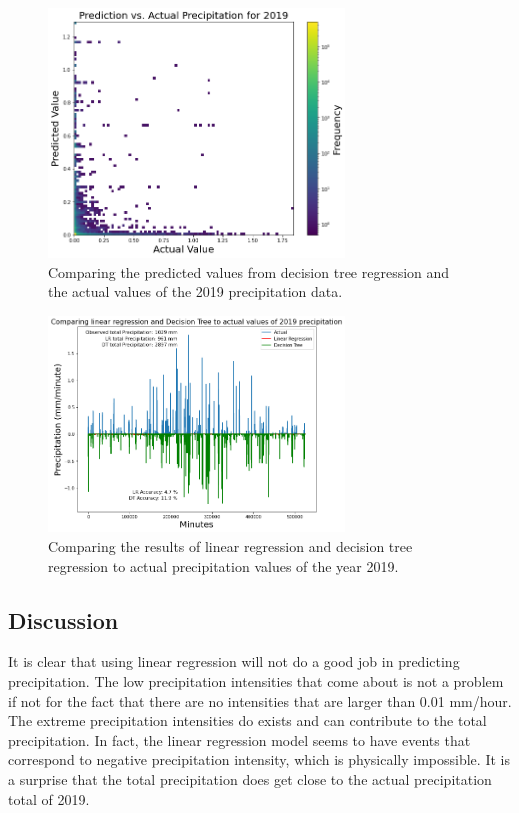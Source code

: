 \documentclass[11pt]{report}
\begin{document}
\begin{figure}[th!]
  \centering
  \includegraphics[width=0.7\textwidth]{Figures/predict_and_actual_2019_precip.png}
  \caption[Comparing ML predicted values to actual precipitation
    values]{\label{DT_compare}Comparing the predicted values from decision tree
    regression and the actual values of the 2019 precipitation data.
  }
\end{figure}
\begin{figure}[bh!]
  \centering
  \includegraphics[width = 0.7\textwidth]{Figures/Comparison.png}
  \caption[Comparing ML results to actual precipitation values]{\label{LR_DT_series}
    Comparing the results of linear regression and decision tree
    regression to actual precipitation values of the year 2019. %
}
\end{figure}

\subsection{Discussion}
It is clear that using linear regression will not do a good job in
predicting precipitation. The low precipitation intensities that come
about is not a problem if not for the fact that there are no intensities
that are larger than 0.01 mm/hour. The extreme precipitation intensities
do exists and can contribute to the total precipitation. In fact, the
linear regression model seems to have events that correspond to negative
precipitation intensity, which is physically impossible. It is a surprise that
the total precipitation does get close to the actual precipitation total of 2019. 
\end{document}
